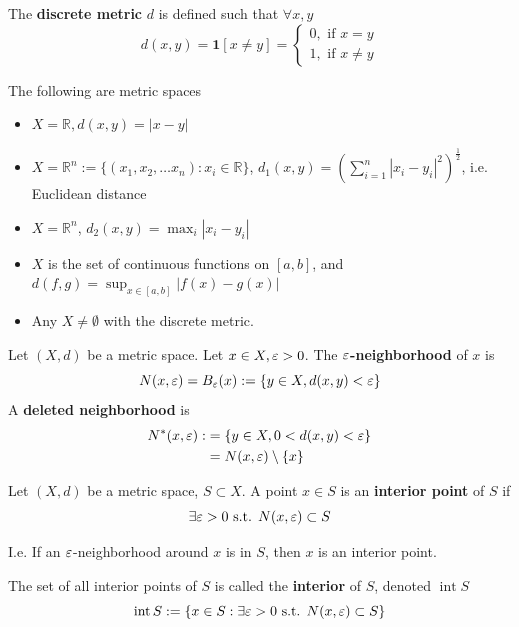 \begin{definition}
    The \textbf{discrete metric} $d$ is defined such that $\forall x, y$
    \[
        d(x,y) = \mathbf{1}[x \neq y] = 
        \begin{cases}
            0, \text{ if } x = y \\
            1, \text{ if } x \neq y 
        \end{cases}
    \]
\end{definition}


\begin{example}
    The following are metric spaces 
    \begin{itemize}
        \item $X = \mathbb{R}, d(x,y) = |x-y|$
        \item 
$
    X = \mathbb{R}^n := \{ 
        (x_1, x_2, \hdots x_n) : x_i \in \mathbb{R}
    \} 
$, 
$
d_1(x, y) = \left( \sum\limits_{i = 1}^{n} |x_i - y_i|^2 \right)^{ \frac{1}{2}}
$, i.e. Euclidean distance
        \item 
$
    X = \mathbb{R}^n 
$, 
$
d_2(x, y) = \max_i |x_i - y_i|
$
\item $X$ is the set of continuous functions on $[a, b]$, and $d(f,g) = \sup_{x \in [a, b]} |f(x) - g(x)|$
\item Any $X \neq \emptyset$ with the discrete metric.
    \end{itemize} 
\end{example}

\begin{definition}[Neighborhood]
    Let $(X,d)$ be a metric space. 
    Let $x \in X, \varepsilon> 0$. 
    The \textbf{$\varepsilon$-neighborhood} of $x$ 
    is 
    \[
        N(x, \varepsilon) = B_{\varepsilon}(x) := 
        \{ 
            y \in X, d(x, y) < \varepsilon
        \} 
    \]
    A \textbf{deleted neighborhood} is 
    \begin{align*}
        N^{*}(x, \varepsilon) :&= \{ 
            y \in X, 0 < d(x, y) < \varepsilon
        \} \\
        &= N(x, \varepsilon) \setminus \{ x \} 
    \end{align*}
\end{definition}

\begin{definition}[Interior]
    Let $(X, d)$ be a metric space, 
    $S \subset X$. 
    A point $x \in S$ is an 
    \textbf{interior point}  of $S$ if 
    \[
    \exists \varepsilon > 0 
    \text{ s.t. }
    N(x, \varepsilon) \subset S 
    \]

    I.e. If an $\varepsilon$-neighborhood around $x$ 
    is in $S$, then $x$ is an interior point.

    \medskip
    
    The set of all interior points of $S$
    is called the \textbf{interior} of $S$, 
    denoted $\operatorname{int} S$
    \[
        \operatorname{int}  S := \{ 
        x \in S: \exists \varepsilon > 0 \text{ s.t. }
        N(x, \varepsilon) \subset S
        \} 
    \]
\end{definition}

